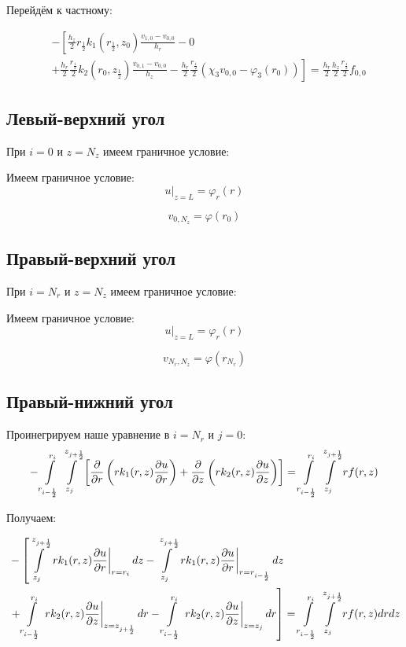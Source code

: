 Перейдём к частному:

\begin{align*}
  &- \left [ 
  \frac{h_z}{2} r_{\frac{1}{2}} k_1(r_{\frac{1}{2}}, z_0) \frac{v_{1, 0} - v_{0, 0}}{h_{r}}
  - 0
  \right . \\
  &\left .
  + \frac{h_r}{2} \frac{r_{\frac{1}{2}}}{2} k_2(r_0, z_{\frac{1}{2}}) \frac{v_{0, 1} - v_{0, 0}}{h_{z}}
  - \frac{h_r}{2} \frac{r_{\frac{1}{2}}}{2} (\chi_3 v_{0, 0} - \varphi_3(r_0))
  \right ]  = \frac{h_r}{2} \frac{h_z}{2} \frac{r_{\frac{1}{2}}}{2} f_{0, 0}
\end{align*}

\subsection{Левый-верхний угол}

При $ i = 0 $ и $ z = N_z $ имеем граничное условие:

Имеем граничное условие:
\[
  \left . u \right \vert_{z=L} = \varphi_r(r) 
\]

\[
  v_{0,N_z} = \varphi(r_0)
\]

\subsection{Правый-верхний угол}

При $ i = N_r $ и $ z = N_z $ имеем граничное условие:

Имеем граничное условие:
\[
  \left . u \right \vert_{z=L} = \varphi_r(r) 
\]

\[
  v_{N_r,N_z} = \varphi(r_{N_r})
\]

\subsection{Правый-нижний угол}

Проинегрируем наше уравнение в $i = N_r$ и $ j = 0$:
\[
  - \int\limits^{r_{i }}_{r_{i -\frac{1}{2}}} \int\limits^{z_{j +\frac{1}{2}}}_{z_{j }} \left [ \pdv{}{r} \left ( r k_1(r, z) \pdv{u}{r} \right ) 
  + \pdv{}{z} \left ( rk_2(r, z)\pdv{u}{z} \right ) \right ] = \int\limits^{r_{i }}_{r_{i -\frac{1}{2}}} \int\limits^{z_{j +\frac{1}{2}}}_{z_{j }} rf(r, z)
\]

Получаем:

\begin{align*}
  &- \left [
   \int\limits^{z_{j +\frac{1}{2}}}_{z_{j }}  \left . r k_1(r, z) \pdv{u}{r} \right \vert_{r = r_i} dz
  - \int\limits^{z_{j +\frac{1}{2}}}_{z_{j }} \left . r k_1(r, z) \pdv{u}{r} \right \vert_{r = r_{i - \frac{1}{2}}} dz
  \right . \\
  &\left . + \int\limits^{r_{i}}_{r_{i-\frac{1}{2}}} \left . rk_2(r, z)\pdv{u}{z} \right \vert_{z = z_{j + \frac{1}{2}}} dr
  - \int\limits^{r_{i}}_{r_{i-\frac{1}{2}}} \left . rk_2(r, z)\pdv{u}{z} \right \vert_{z = z_{j}} dr
  \right ] = \int\limits^{r_{i }}_{r_{i -\frac{1}{2}}} \int\limits^{z_{j +\frac{1}{2}}}_{z_{j }} rf(r, z) dr dz
\end{align*}

